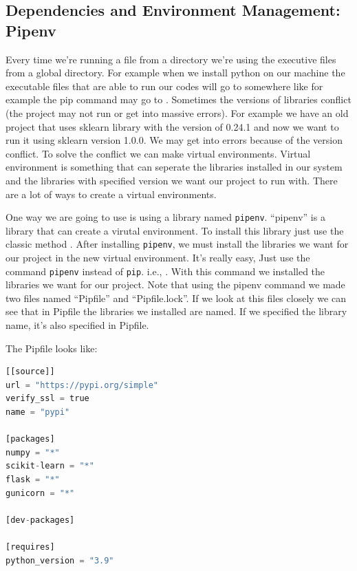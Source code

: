 \documentclass[letterpaper,12pt,notitlepage,twoside]{report}
\begin{document}
\subsection{Dependencies and Environment Management: Pipenv}
Every time we're running a file from a directory we're using the executive files from a global directory. For example when we install python on our machine the executable files that are able to run our codes will go to somewhere like  for example the pip command may go to . Sometimes the versions of libraries conflict (the project may not run or get into massive errors). For example we have an old project that uses sklearn library with the version of 0.24.1 and now we want to run it using sklearn version 1.0.0. We may get into errors because of the version conflict.
To solve the conflict we can make virtual environments. Virtual environment is something that can seperate the libraries installed in our system and the libraries with specified version we want our project to run with. There are a lot of ways to create a virtual environments. 

One way we are going to use is using a library named \texttt{pipenv}.  ``pipenv'' is a library that can create a virutal environment. To install this library just use the classic method . After installing \texttt{pipenv}, we must install the libraries we want for our project in the new virtual environment. It's really easy, Just use the command \texttt{pipenv} instead of \texttt{pip}. i.e., . With this command we installed the libraries we want for our project. Note that using the pipenv command we made two files named ``Pipfile'' and ``Pipfile.lock''. If we look at this files closely we can see that in Pipfile the libraries we installed are named. If we specified the library name, it's also specified in Pipfile.

The Pipfile looks like:
\begin{lstlisting}[language=python, numbers=none]
[[source]]
url = "https://pypi.org/simple"
verify_ssl = true
name = "pypi"

[packages]
numpy = "*"
scikit-learn = "*"
flask = "*"
gunicorn = "*"

[dev-packages]

[requires]
python_version = "3.9"

\end{lstlisting}
\end{document}

